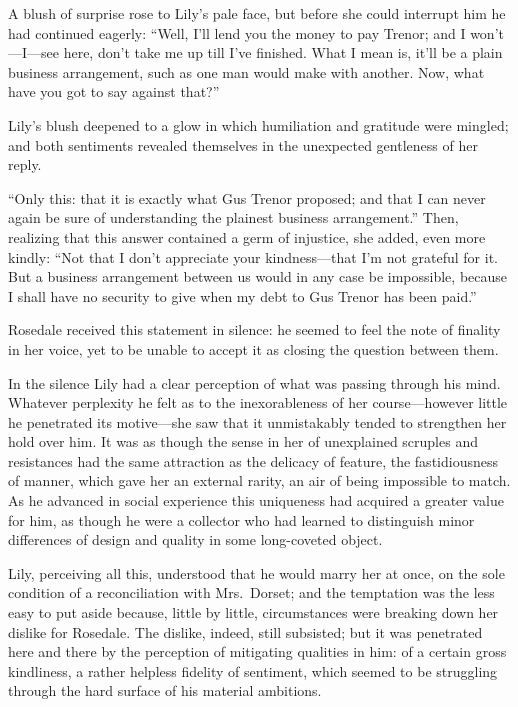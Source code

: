\documentclass[12pt,a4paper]{book}
\begin{document}
A blush of surprise rose to Lily's pale face, but before she
could interrupt him he had continued eagerly: ``Well, I'll lend
you the money to pay Trenor; and I won't---I---see here, don't take
me up till I've finished. What I mean is, it'll be a plain
business arrangement, such as one man would make with another. 
Now, what have you got to say against that?''





Lily's blush deepened to a glow in which humiliation and
gratitude were mingled; and both sentiments revealed themselves
in the unexpected gentleness of her reply.





``Only this: that it is exactly what Gus Trenor proposed; and that
I can never again be sure of understanding the plainest business
arrangement.'' Then, realizing that this answer contained a germ
of injustice, she added, even more kindly: ``Not that I don't
appreciate your kindness---that I'm not grateful for it. But a
business arrangement between us would in any case be impossible,
because I shall have no security to give when my debt to Gus
Trenor has been paid.''





Rosedale received this statement in silence: he seemed to feel the
note of finality in her voice, yet to be unable to accept it as
closing the question between them.





In the silence Lily had a clear perception of what was passing
through his mind. Whatever perplexity he felt as to the
inexorableness of her course---however little he penetrated its
motive---she saw that it unmistakably tended to strengthen her
hold over him. It was as though the sense in her of unexplained
scruples and resistances had the same attraction as the delicacy
of feature, the fastidiousness of manner, which gave her an
external rarity, an air of being impossible to match. As he
advanced in social experience this uniqueness had acquired a
greater value for him, as though he were a collector who had
learned to distinguish minor differences of design and quality in
some long-coveted object.





Lily, perceiving all this, understood that he would marry her at
once, on the sole condition of a reconciliation with Mrs.\ Dorset;
and the temptation was the less easy to put aside because, little
by little, circumstances were breaking down her dislike for
Rosedale. The dislike, indeed, still subsisted; but it was
penetrated here and there by the perception of mitigating
qualities in him: of a certain gross kindliness, a rather
helpless fidelity of sentiment, which seemed to be struggling
through the hard surface of his material ambitions.
\end{document}
